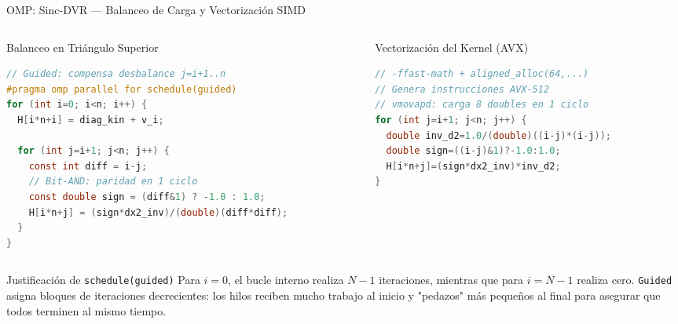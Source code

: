 \documentclass[aspectratio=169,10pt]{beamer}
\begin{document}
\begin{frame}[fragile]{OMP: Sinc-DVR — Balanceo de Carga y Vectorización SIMD}

\begin{columns}[T]

  \begin{column}{0.48\textwidth}
    \begin{block}{Balanceo en Triángulo Superior}
    \begin{lstlisting}[language=C,style=cppBeamer,basicstyle=\tiny\ttfamily]
// Guided: compensa desbalance j=i+1..n
#pragma omp parallel for schedule(guided)
for (int i=0; i<n; i++) {
  H[i*n+i] = diag_kin + v_i; 

  for (int j=i+1; j<n; j++) {
    const int diff = i-j;
    // Bit-AND: paridad en 1 ciclo
    const double sign = (diff&1) ? -1.0 : 1.0;
    H[i*n+j] = (sign*dx2_inv)/(double)(diff*diff);
  }
}
    \end{lstlisting}
    \end{block}
  \end{column}

  \begin{column}{0.48\textwidth}
    \begin{block}{Vectorización del Kernel (AVX)}
    \begin{lstlisting}[language=C,style=cppBeamer,basicstyle=\tiny\ttfamily]
// -ffast-math + aligned_alloc(64,...) 
// Genera instrucciones AVX-512
// vmovapd: carga 8 doubles en 1 ciclo
for (int j=i+1; j<n; j++) {
  double inv_d2=1.0/(double)((i-j)*(i-j));
  double sign=((i-j)&1)?-1.0:1.0;
  H[i*n+j]=(sign*dx2_inv)*inv_d2;
}
    \end{lstlisting}
    \end{block}
    \vspace{-0.2cm}
    
  \end{column}

\end{columns}

\vspace{0.3cm}

\begin{conclusionbox}{Justificación de \texttt{schedule(guided)}}
Para $i=0$, el bucle interno realiza $N-1$ iteraciones, mientras que para $i=N-1$ realiza cero. \texttt{Guided} asigna bloques de iteraciones decrecientes: los hilos reciben mucho trabajo al inicio y "pedazos" más pequeños al final para asegurar que todos terminen al mismo tiempo.
\end{conclusionbox}

\end{frame}
\end{document}

